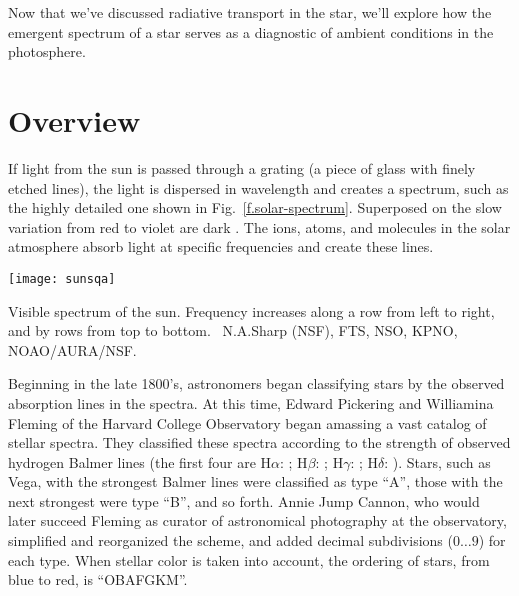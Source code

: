 
\nocite{Mihalas1978Stellar-Atmosph,LeBlanc2010An-Introduction,Carroll2006An-Introduction}

Now that we've discussed radiative transport in the star, we'll explore how the emergent spectrum of a star serves as a diagnostic of ambient conditions in the photosphere.

\section{Overview}

If light from the sun is passed through a grating (a piece of glass with finely etched lines), the light is dispersed in wavelength and creates a spectrum, such as the highly detailed one shown in Fig.~\ref{f.solar-spectrum}. Superposed on the slow variation from red to violet are dark . The ions, atoms, and molecules in the solar atmosphere absorb light at specific frequencies and create these lines.
\begin{marginfigure}
\texttt{[image: sunsqa]}
\caption[Visible spectrum of the sun]{\label{f.solar-spectrum} Visible spectrum of the sun. Frequency increases along a row from left to right, and by rows from top to bottom. \imgcredcopy\ 
N.A.Sharp (NSF), FTS, NSO, KPNO, NOAO/AURA/NSF.}
\end{marginfigure}

Beginning in the late 1800's, astronomers began classifying stars by the observed absorption lines in the spectra. At this time, Edward Pickering and Williamina Fleming of the Harvard College Observatory began amassing a vast catalog of stellar spectra. They classified these spectra according to the strength of observed hydrogen Balmer lines (the first four are H$\alpha$: ; H$\beta$: ; H$\gamma$: ; H$\delta$: ). Stars, such as Vega, with the strongest Balmer lines were classified as type ``A'', those with the next strongest were type ``B'', and so forth. Annie Jump Cannon, who would later succeed Fleming as curator of astronomical photography at the observatory, simplified and reorganized the scheme, and added decimal subdivisions ($0\ldots9$) for each type. When stellar color is taken into account, the ordering of stars, from blue to red, is ``OBAFGKM''. 

